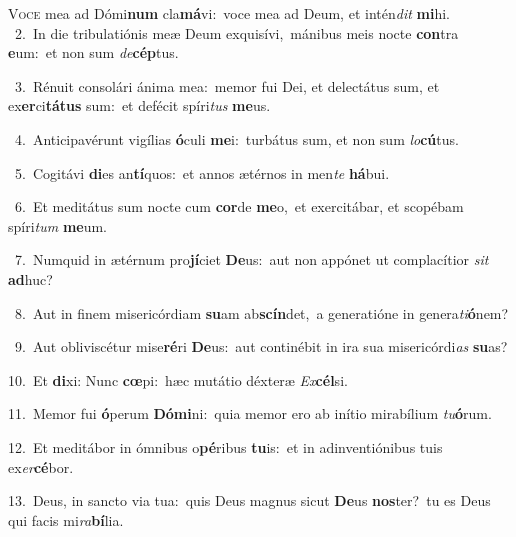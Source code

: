 \lettrine{\initial\textcolor{\initialcolor}{V}}{oce} mea ad Dómi\textbf{num} cla\-\textbf{má}\-vi:~\star voce mea ad Deum, et intén\textit{dit} \textbf{mi}\-hi.\\
{\numbfont\textcolor{\numbcolor}{~2.}}~In die tribulatiónis meæ Deum exquisívi,~\dagger mánibus meis nocte \textbf{con}\-tra \textbf{e}\-um:~\star et non sum \textit{de}\-\textbf{cép}tus.\par
{\numbfont\textcolor{\numbcolor}{~3.}}~Rénuit consolári ánima mea:~\dagger memor fui Dei, et delectátus sum, et ex\-\textbf{er}\-ci\-\textbf{tá}\-\textbf{tus} sum:~\star et defécit spíri\textit{tus} \textbf{me}\-us.\par
{\numbfont\textcolor{\numbcolor}{~4.}}~Anticipavérunt vigílias \textbf{ó}\-culi \textbf{me}\-i:~\star turbátus sum, et non sum \textit{lo}\-\textbf{cú}tus.\par
{\numbfont\textcolor{\numbcolor}{~5.}}~Cogitávi \textbf{di}\-es an\-\textbf{tí}\-quos:~\star et annos ætérnos in men\textit{te} \textbf{há}\-bui.\par
{\numbfont\textcolor{\numbcolor}{~6.}}~Et meditátus sum nocte cum \textbf{cor}\-de \textbf{me}\-o,~\star et exercitábar, et scopébam spíri\textit{tum} \textbf{me}\-um.\par
{\numbfont\textcolor{\numbcolor}{~7.}}~Numquid in ætérnum pro\-\textbf{jí}\-ciet \textbf{De}\-us:~\star aut non appónet ut complacítior \textit{sit} \textbf{ad}\-huc?\par
{\numbfont\textcolor{\numbcolor}{~8.}}~Aut in finem misericórdiam \textbf{su}\-am ab\-\textbf{scín}\-det,~\star a generatióne in genera\-\textit{ti}\-\textbf{ó}nem?\par
{\numbfont\textcolor{\numbcolor}{~9.}}~Aut obliviscétur mise\-\textbf{ré}\-ri \textbf{De}\-us:~\star aut continébit in ira sua misericórdi\textit{as} \textbf{su}\-as?\par
{\numbfont\textcolor{\numbcolor}{10.}}~Et \textbf{di}\-xi: Nunc \textbf{cœ}\-pi:~\star hæc mutátio déxteræ \textit{Ex}\-\textbf{cél}si.\par
{\numbfont\textcolor{\numbcolor}{11.}}~Memor fui \textbf{ó}\-perum \textbf{Dó}\-\textbf{mi}ni:~\star quia memor ero ab inítio mirabílium \textit{tu}\-\textbf{ó}rum.\par
{\numbfont\textcolor{\numbcolor}{12.}}~Et meditábor in ómnibus o\-\textbf{pé}\-ribus \textbf{tu}\-is:~\star et in adinventiónibus tuis ex\-\textit{er}\-\textbf{cé}bor.\par
{\numbfont\textcolor{\numbcolor}{13.}}~Deus, in sancto via tua:~\dagger quis Deus magnus sicut \textbf{De}\-us \textbf{nos}\-ter?~\star tu es Deus qui facis mi\-\textit{ra}\-\textbf{bí}lia.\par
